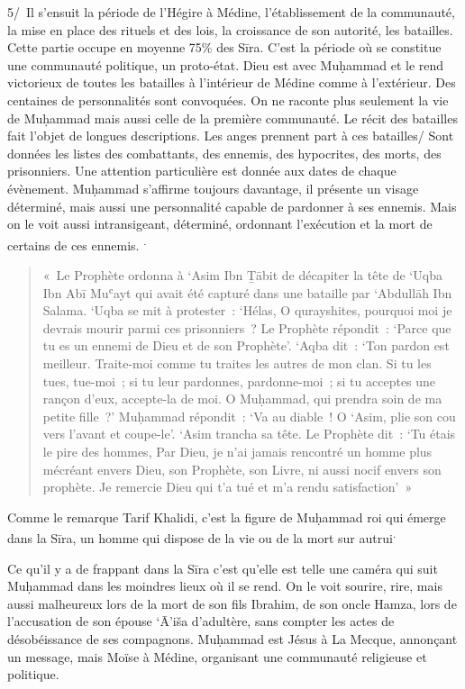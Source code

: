 5/~Il s'ensuit la période de l'Hégire à Médine, l'établissement de la
communauté, la mise en place des rituels et des lois, la croissance de
son autorité, les batailles. Cette partie occupe en moyenne 75\% des
Sīra. C'est la période où se constitue une communauté politique, un
proto-état. Dieu est avec Muḥammad et le rend victorieux de toutes les
batailles à l'intérieur de Médine comme à l'extérieur. Des centaines de
personnalités sont convoquées. On ne raconte plus seulement la vie de
Muḥammad mais aussi celle de la première communauté. Le récit des
batailles fait l'objet de longues descriptions. Les anges prennent part
à ces batailles/ Sont données les listes des combattants, des ennemis,
des hypocrites, des morts, des prisonniers. Une attention particulière
est donnée aux dates de chaque évènement. Muḥammad s'affirme toujours
davantage, il présente un visage déterminé, mais aussi une personnalité
capable de pardonner à ses ennemis. Mais on le voit aussi intransigeant,
déterminé, ordonnant l'exécution et la mort de certains de ces ennemis. \textsuperscript{.}
\begin{quote}
{«~Le Prophète ordonna à `Asim Ibn Ṯābit de décapiter la tête de
`Uqba Ibn Abī Muʿayt qui avait été capturé dans une bataille par
`Abdullāh Ibn Salama. `}Uqba se mit à protester{~: `Hélas, O
qurayshites, pourquoi moi je devrais mourir parmi ces prisonniers~?} Le
Prophète répondit~: `Parce que tu es un ennemi de Dieu et de son
Prophète'. `Aqba dit~: `Ton pardon est meilleur. Traite-moi comme tu
traites les autres de mon clan. Si tu les tues, tue-moi~; si tu leur
pardonnes, pardonne-moi~; si tu acceptes une rançon d'eux, accepte-la de
moi. O Muḥammad, qui prendra soin de ma petite fille~?' Muḥammad
répondit~: `Va au diable~! O `Asim, plie son cou vers l'avant et
coupe-le'. `Asim trancha sa tête. Le Prophète dit~: `Tu étais le pire
des hommes, Par Dieu, je n'ai jamais rencontré un homme plus mécréant
envers Dieu, son Prophète, son Livre, ni aussi nocif envers son
prophète. Je remercie Dieu qui t'a tué et m'a rendu
satisfaction'~»
\end{quote}


Comme le remarque Tarif Khalidi, c'est la figure de Muḥammad roi qui
émerge dans la Sīra, un homme qui dispose de la vie ou de la mort sur
autrui\textsuperscript{.}

Ce qu'il y a de frappant dans la Sīra c'est qu'elle est telle une caméra
qui suit Muḥammad dans les moindres lieux où il se rend. On le voit
sourire, rire, mais aussi malheureux lors de la mort de son fils
Ibrahim, de son oncle Hamza, lors de l'accusation de son épouse `Ā'iša
d'adultère, sans compter les actes de désobéissance de ses compagnons.
Muḥammad est Jésus à La Mecque, annonçant un message, mais Moïse à
Médine, organisant une communauté religieuse et politique.

